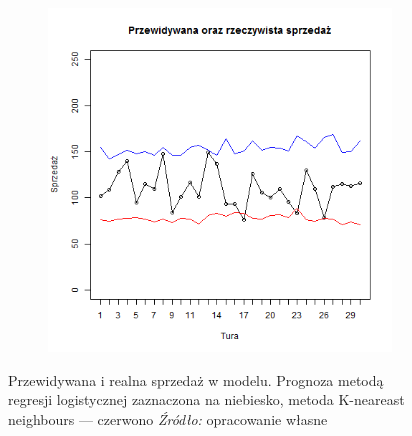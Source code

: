 \documentclass[polish, twoside, 12pt, a4paper]{article}
\theoremstyle{definition}
\theoremstyle{plain}
\theoremstyle{remark}
\begin{document}
\begin{figure}[hbt]
  \centering

  \begin{subfigure}[t]{0.45\textwidth}
    \includegraphics[width=\textwidth]{pictures/prognozy_lg_kn.png}
  \end{subfigure}
  \captionsetup{margin=10pt,font=small,labelfont=bf,width=.8\textwidth}

  \caption[Przewidywana i realna sprzedaż w modelu]{Przewidywana i realna sprzedaż w modelu. Prognoza metodą regresji logistycznej zaznaczona na niebiesko, metoda K-neareast neighbours --- czerwono \textit{Źródło:} opracowanie własne}\label{fig:prognozy_porowniania}
\end{figure}
\end{document}
